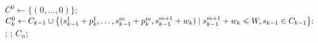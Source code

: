 \begin{algorithmic}[1] %
    \State $C^0 \gets \{(0, \ldots, 0)\}$;
      \State $C_k^0 \gets C_{k-1} \cup \big\{(s_{k-1}^1 + p_k^1, \ldots, s_{k-1}^m + p_k^m, s_{k-1}^{m+1} + w_k)
        \; | \; s_{k-1}^{m+1} + w_k \leqslant W, s_{k-1} \in C_{k-1} \big\};$
        ;
      \EndFor
      ;
    \EndFor
  \State \Return $C_n$;
  \EndFunction
\end{algorithmic}
